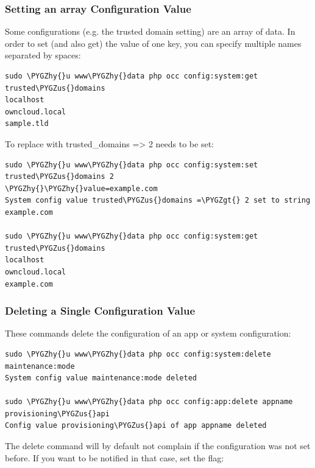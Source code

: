 \documentclass[letterpaper,10pt,english]{sphinxmanual}
\def\PYGZus{\char`\_}
\def\PYGZgt{\char`\>}
\def\PYGZhy{\char`\-}
\begin{document}
\subsubsection{Setting an array Configuration Value}
\label{configuration_server/occ_command:setting-an-array-configuration-value}
Some configurations (e.g. the trusted domain setting) are an array of data.
In order to set (and also get) the value of one key, you can specify multiple
 names separated by spaces:

\begin{Verbatim}[commandchars=\\\{\}]
sudo \PYGZhy{}u www\PYGZhy{}data php occ config:system:get trusted\PYGZus{}domains
localhost
owncloud.local
sample.tld
\end{Verbatim}

To replace  with  trusted\_domains =\textgreater{} 2 needs to be
set:

\begin{Verbatim}[commandchars=\\\{\}]
sudo \PYGZhy{}u www\PYGZhy{}data php occ config:system:set trusted\PYGZus{}domains 2
\PYGZhy{}\PYGZhy{}value=example.com
System config value trusted\PYGZus{}domains =\PYGZgt{} 2 set to string example.com

sudo \PYGZhy{}u www\PYGZhy{}data php occ config:system:get trusted\PYGZus{}domains
localhost
owncloud.local
example.com
\end{Verbatim}


\subsubsection{Deleting a Single Configuration Value}
\label{configuration_server/occ_command:deleting-a-single-configuration-value}
These commands delete the configuration of an app or system configuration:

\begin{Verbatim}[commandchars=\\\{\}]
sudo \PYGZhy{}u www\PYGZhy{}data php occ config:system:delete maintenance:mode
System config value maintenance:mode deleted

sudo \PYGZhy{}u www\PYGZhy{}data php occ config:app:delete appname provisioning\PYGZus{}api
Config value provisioning\PYGZus{}api of app appname deleted
\end{Verbatim}

The delete command will by default not complain if the configuration was not set
before. If you want to be notified in that case, set the
 flag:
\end{document}
